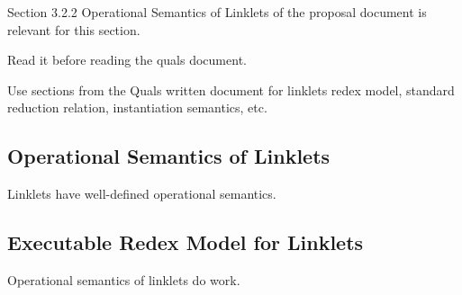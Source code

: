 		\begin{todo}[Import]
			Section 3.2.2 Operational Semantics of Linklets of the proposal document is relevant for this section.

			Read it before reading the quals document.
		\end{todo}

		\begin{todo}[Import]
			Use sections from the Quals written document for linklets redex model, standard reduction relation, instantiation semantics, etc.
		\end{todo}

		\subsection{Operational Semantics of Linklets}

			\begin{mainpoint}
				Linklets have well-defined operational semantics.
			\end{mainpoint}

		\subsection{Executable Redex Model for Linklets}

			\begin{mainpoint}
				Operational semantics of linklets do work.
			\end{mainpoint}


